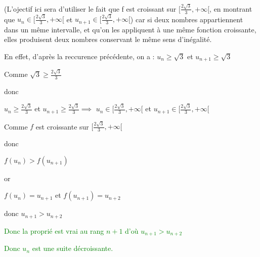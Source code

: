 \documentclass[12pt]{article}
\begin{document}
\begin{enumerate}
\begin{enumerate}
(L'ojectif ici sera d'utiliser le fait que f est croissant sur \( [\frac{2\sqrt{3}}{3}, +\infty[ \), en montrant que  \(u_{n}\in [\frac{2\sqrt{3}}{3}, +\infty[ \) et \(u_{n+1}\in [\frac{2\sqrt{3}}{3}, +\infty[ \)) car si deux nombres appartiennent dans un même intervalle, et qu'on les appliquent à une même fonction croissante, elles produisent deux nombres conservant le même sens d'inégalité.

En effet, d'après la reccurence précédente, on a : \(u_{n} \geq \sqrt{3}\) et \(u_{n+1} \geq \sqrt{3}\)

Comme \( \sqrt{3} \geq \frac{2\sqrt{3}}{3} \)

donc 

\(u_{n} \geq \frac{2\sqrt{3}}{3}\) et \(u_{n+1} \geq \frac{2\sqrt{3}}{3} \implies\) 
\(u_{n}\in [\frac{2\sqrt{3}}{3}, +\infty[ \) et \(u_{n+1}\in [\frac{2\sqrt{3}}{3}, +\infty[ \)

Comme \(f\) est croissante sur \([\frac{2\sqrt{3}}{3}, +\infty[ \)

donc 

\( f(u_{n})>f(u_{n+1}) \) 

or 

\( f(u_{n})=u_{n+1} \) et \( f(u_{n+1})= u_{n+2}\)

donc \( u_{n+1} > u_{n+2} \)

\textcolor{green}{Donc la proprié est vrai au rang \(n+1\) d'où \( u_{n+1} > u_{n+2} \)}

\textcolor{green}{Donc \( u_{n} \) est une suite décroissante.}
\end{enumerate}


\end{enumerate}
\end{document}
